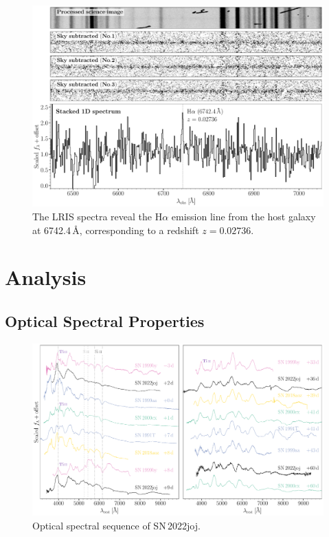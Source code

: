 \documentclass[twocolumn]{aastex631}
\newcommand{\sn}{SN\,2022joj}
\begin{document}
\begin{CJK*}{UTF8}{gbsn}


\begin{figure}
    \centering
    \includegraphics[width=\linewidth]{host_spec.pdf}
    \caption{The LRIS spectra reveal the H$\alpha$ emission line from the host galaxy at 6742.4\,\AA, corresponding to a redshift $z=0.02736$.}
    \label{fig:host_spec}
\end{figure}

\section{Analysis} \label{sec:analysis}

\subsection{Optical Spectral Properties}
\begin{figure}
    \centering
    \includegraphics[width=\linewidth]{spec_comp.pdf}
    \caption{Optical spectral sequence of \sn.}
    \label{fig:spec_comp}
\end{figure}


\end{CJK*}
\end{document}
